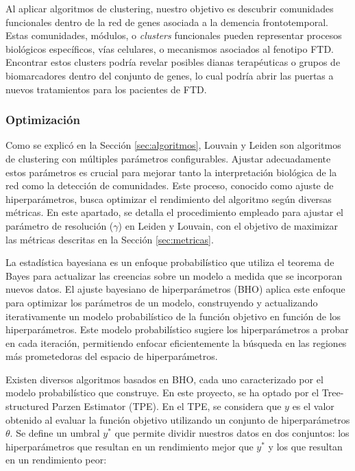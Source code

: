 Al aplicar algoritmos de clustering, nuestro objetivo es descubrir comunidades funcionales dentro de la red de genes asociada a la demencia frontotemporal. Estas comunidades, módulos, o \textit{clusters} funcionales pueden representar procesos biológicos específicos, vías celulares, o mecanismos asociados al fenotipo FTD. Encontrar estos clusters podría revelar posibles dianas terapéuticas o grupos de biomarcadores dentro del conjunto de genes, lo cual podría abrir las puertas a nuevos tratamientos para los pacientes de FTD.




\subsubsection{Optimización}

Como se explicó en la Sección \ref{sec:algoritmos}, Louvain y Leiden son algoritmos de clustering con múltiples parámetros configurables. Ajustar adecuadamente estos parámetros es crucial para mejorar tanto la interpretación biológica de la red como la detección de comunidades. Este proceso, conocido como ajuste de hiperparámetros, busca optimizar el rendimiento del algoritmo según diversas métricas. En este apartado, se detalla el procedimiento empleado para ajustar el parámetro de resolución (\(\gamma\)) en Leiden y Louvain, con el objetivo de maximizar las métricas descritas en la Sección \ref{sec:metricas}.

La estadística bayesiana es un enfoque probabilístico que utiliza el teorema de Bayes para actualizar las creencias sobre un modelo a medida que se incorporan nuevos datos. El ajuste bayesiano de hiperparámetros (BHO) aplica este enfoque para optimizar los parámetros de un modelo, construyendo y actualizando iterativamente un modelo probabilístico de la función objetivo en función de los hiperparámetros. Este modelo probabilístico sugiere los hiperparámetros a probar en cada iteración, permitiendo enfocar eficientemente la búsqueda en las regiones más prometedoras del espacio de hiperparámetros.

Existen diversos algoritmos basados en BHO, cada uno caracterizado por el modelo probabilístico que construye. En este proyecto, se ha optado por el Tree-structured Parzen Estimator (TPE). En el TPE, se considera que \( y \) es el valor obtenido al evaluar la función objetivo utilizando un conjunto de hiperparámetros \( \theta \). Se define un umbral \( y^* \) que permite dividir nuestros datos en dos conjuntos: los hiperparámetros que resultan en un rendimiento mejor que \( y^* \) y los que resultan en un rendimiento peor:

